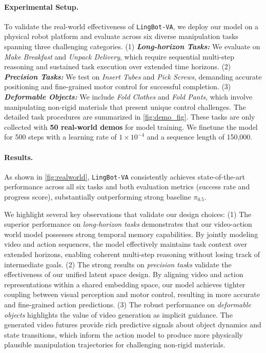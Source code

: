 \documentclass[onecolumn]{robbyant}           %
\newcommand\methodname{LingBot-VA}
\newcommand{\method}{\texttt{\methodname}\xspace}
\begin{document}
\paragraph{Experimental Setup.} To validate the real-world effectiveness of \method, we deploy our model on a physical robot platform and evaluate across six diverse manipulation tasks spanning three challenging categories.
(1) \textbf{\textit{Long-horizon Tasks:}} We evaluate on \textit{Make Breakfast} and \textit{Unpack Delivery}, which require sequential multi-step reasoning and sustained task execution over extended time horizons.
(2) \textbf{\textit{Precision Tasks:}} We test on \textit{Insert Tubes} and \textit{Pick Screws}, demanding accurate positioning and fine-grained motor control for successful completion.
(3) \textbf{\textit{Deformable Objects:}} We include \textit{Fold Clothes} and \textit{Fold Pants}, which involve manipulating non-rigid materials that present unique control challenges.
The detailed task procedures are summarized in \cref{fig:demo_fig}. 
These tasks are only collected with \textbf{50 real-world demos} for model training.
 We finetune the model for 500 steps with a learning rate of $1 \times 10^{-4}$ and a sequence length of 150,000. 




\paragraph{Results.}  As shown in \cref{fig:realworld}, \method consistently achieves state-of-the-art performance across all six tasks and both evaluation metrics (success rate and progress score), substantially outperforming strong baseline $\pi_{0.5}$.

We highlight several key observations that validate our design choices:
(1) The superior performance on \textit{long-horizon tasks} demonstrates that our video-action world model possesses strong temporal memory capabilities. By jointly modeling video and action sequences, the model effectively maintains task context over extended horizons, enabling coherent multi-step reasoning without losing track of intermediate goals.
(2) The strong results on \textit{precision tasks} validate the effectiveness of our unified latent space design. By aligning video and action representations within a shared embedding space, our model achieves tighter coupling between visual perception and motor control, resulting in more accurate and fine-grained action predictions.
(3) The robust performance on \textit{deformable objects} highlights the value of video generation as implicit guidance. The generated video futures provide rich predictive signals about object dynamics and state transitions, which inform the action model to produce more physically plausible manipulation trajectories for challenging non-rigid materials.
\end{document}
